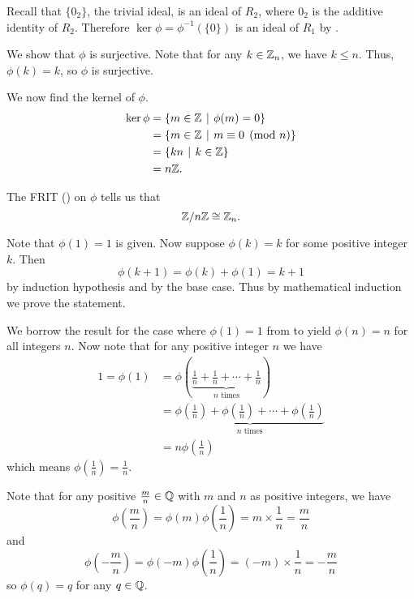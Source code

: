 \begin{questions}
    \item Recall that $\{0_2\}$, the trivial ideal, is an ideal of $R_2$, where $0_2$ is the additive identity of $R_2$. Therefore $\ker\phi = \phi^{-1}(\{0\})$ is an ideal of $R_1$ by .

    \item We show that $\phi$ is surjective. Note that for any $k \in \mathbb{Z}_n$, we have $k \leq n$. Thus, $\phi(k) = k$, so $\phi$ is surjective.

    We now find the kernel of $\phi$.
    \begin{align*}
        \ker\phi &= \{m \in \Z \vert \phi(m) = 0\}\\
        &= \{m \in \Z \vert m \equiv 0 \pmod n\}\\
        &= \{kn \vert k \in \Z\}\\
        &= n\Z.
    \end{align*}

    The FRIT () on $\phi$ tells us that
    \[
        \mathbb{Z}/n\mathbb{Z} \cong \mathbb{Z}_n.
    \]

    \item Note that $\phi(1) = 1$ is given. Now suppose $\phi(k) = k$ for some positive integer $k$. Then
    \[
        \phi(k+1) = \phi(k) + \phi(1) = k + 1
    \]
    by induction hypothesis and by the base case. Thus by mathematical induction we prove the statement.

    \item We borrow the result for the case where $\phi(1) = 1$ from  to yield $\phi(n) = n$ for all integers $n$. Now note that for any positive integer $n$ we have
    \begin{align*}
        1 = \phi(1) &= \phi\left(\underbrace{\frac1n + \frac1n + \cdots + \frac1n}_{n \text{ times}}\right)\\
        &= \underbrace{\phi\left(\frac1n\right) + \phi\left(\frac1n\right) + \cdots + \phi\left(\frac1n\right)}_{n \text{ times}}\\
        &= n\phi\left(\frac1n\right)
    \end{align*}
    which means $\phi\left(\frac1n\right) = \frac1n$.

    Note that for any positive $\frac mn \in \mathbb{Q}$ with $m$ and $n$ as positive integers, we have
    \[
        \phi\left(\frac mn\right) = \phi(m)\phi\left(\frac1n\right) = m \times \frac1n = \frac mn
    \]
    and
    \[
        \phi\left(-\frac mn\right) = \phi(-m)\phi\left(\frac1n\right) = (-m) \times \frac1n = -\frac mn
    \]
    so $\phi(q) = q$ for any $q \in \mathbb{Q}$.
\end{questions}

